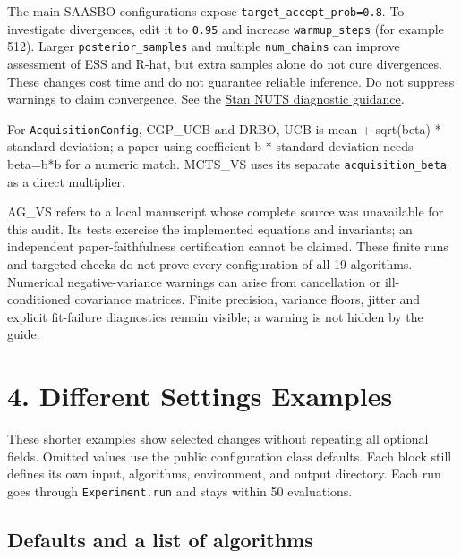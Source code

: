 \documentclass[10pt,a4paper]{article}
\begin{document}
The main SAASBO configurations expose \texttt{target\_\allowbreak{}accept\_\allowbreak{}prob=\allowbreak{}0.8}. To investigate divergences,\allowbreak{} edit it to \texttt{0.95} and increase \texttt{warmup\_\allowbreak{}steps} (for example 512). Larger \texttt{posterior\_\allowbreak{}samples} and multiple \texttt{num\_\allowbreak{}chains} can improve assessment of ESS and R-hat,\allowbreak{} but extra samples alone do not cure divergences. These changes cost time and do not guarantee reliable inference. Do not suppress warnings to claim convergence. See the \href{https://mc-stan.org/docs/2_39/cmdstan-guide/diagnose_utility.html}{Stan NUTS diagnostic guidance}.


For \texttt{Acquisition\allowbreak{}Config},\allowbreak{} CGP\_\allowbreak{}UCB and DRBO,\allowbreak{} UCB is mean + sqrt(beta) * standard deviation; a paper using coefficient b * standard deviation needs beta=b*b for a numeric match. MCTS\_\allowbreak{}VS uses its separate \texttt{acquisition\_\allowbreak{}beta} as a direct multiplier.


AG\_\allowbreak{}VS refers to a local manuscript whose complete source was unavailable for this audit. Its tests exercise the implemented equations and invariants; an independent paper-faithfulness certification cannot be claimed. These finite runs and targeted checks do not prove every configuration of all 19 algorithms. Numerical negative-variance warnings can arise from cancellation or ill-conditioned covariance matrices. Finite precision,\allowbreak{} variance floors,\allowbreak{} jitter and explicit fit-failure diagnostics remain visible; a warning is not hidden by the guide.



\clearpage
{}
\section*{4. Different Settings Examples}

These shorter examples show selected changes without repeating all optional fields. Omitted values use the public configuration class defaults. Each block still defines its own input,\allowbreak{} algorithms,\allowbreak{} environment,\allowbreak{} and output directory. Each run goes through \texttt{Experiment.\allowbreak{}run} and stays within 50 evaluations.



\subsection*{Defaults and a list of algorithms}
\end{document}

